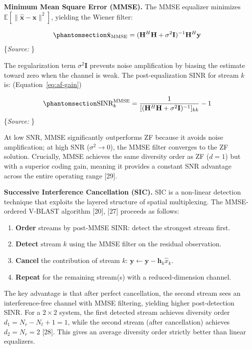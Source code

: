 \documentclass[
  english,
  12pt,
  12pt,
  a4paper,
  oneside]{report}
\providecommand{\tightlist}{%
  \setlength{\itemsep}{0pt}\setlength{\parskip}{0pt}}
\begin{document}
\textbf{Minimum Mean Square Error (MMSE).} The MMSE equalizer minimizes \(\mathbb{E}[\|\hat{\mathbf{x}} - \mathbf{x}\|^2]\), yielding the Wiener filter:

\begin{equation}\protect\phantomsection\label{eq:mmse-equalizer}{\hat{\mathbf{x}}_{\text{MMSE}} = (\mathbf{H}^H\mathbf{H} + \sigma^2\mathbf{I})^{-1}\mathbf{H}^H\mathbf{y}
}\end{equation} \footnotesize\{\textit{Source: \1}\}\normalsize

The regularization term \(\sigma^2\mathbf{I}\) prevents noise amplification by biasing the estimate toward zero when the channel is weak. The post-equalization SINR for stream \(k\) is: (Equation~\ref{eq:af-gain})

\begin{equation}\protect\phantomsection\label{eq:mmse-sinr}{\text{SINR}_k^{\text{MMSE}} = \frac{1}{[(\mathbf{H}^H\mathbf{H} + \sigma^2\mathbf{I})^{-1}]_{kk}} - 1
}\end{equation} \footnotesize\{\textit{Source: \1}\}\normalsize

At low SNR, MMSE significantly outperforms ZF because it avoids noise amplification; at high SNR (\(\sigma^2 \to 0\)), the MMSE filter converges to the ZF solution. Crucially, MMSE achieves the same diversity order as ZF (\(d = 1\)) but with a superior coding gain, meaning it provides a constant SNR advantage across the entire operating range {[}29{]}.

\textbf{Successive Interference Cancellation (SIC).} SIC is a non-linear detection technique that exploits the layered structure of spatial multiplexing. The MMSE-ordered V-BLAST algorithm {[}20{]}, {[}27{]} proceeds as follows:

\begin{enumerate}
\def\labelenumi{\arabic{enumi}.}
\tightlist
\item
  \textbf{Order} streams by post-MMSE SINR: detect the strongest stream first.
\item
  \textbf{Detect} stream \(k\) using the MMSE filter on the residual observation.
\item
  \textbf{Cancel} the contribution of stream \(k\): \(\mathbf{y} \leftarrow \mathbf{y} - \mathbf{h}_k \hat{x}_k\).
\item
  \textbf{Repeat} for the remaining stream(s) with a reduced-dimension channel.
\end{enumerate}

The key advantage is that after perfect cancellation, the second stream sees an interference-free channel with MMSE filtering, yielding higher post-detection SINR. For a \(2 \times 2\) system, the first detected stream achieves diversity order \(d_1 = N_r - N_t + 1 = 1\), while the second stream (after cancellation) achieves \(d_2 = N_r = 2\) {[}28{]}. This gives an average diversity order strictly better than linear equalizers.
\end{document}
